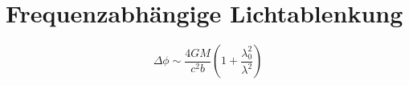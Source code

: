 \section{Frequenzabhängige Lichtablenkung}
\[ \Delta \phi \sim \frac{4GM}{c^2b}\left(1 + \frac{\lambda_0^2}{\lambda^2}\right) \]